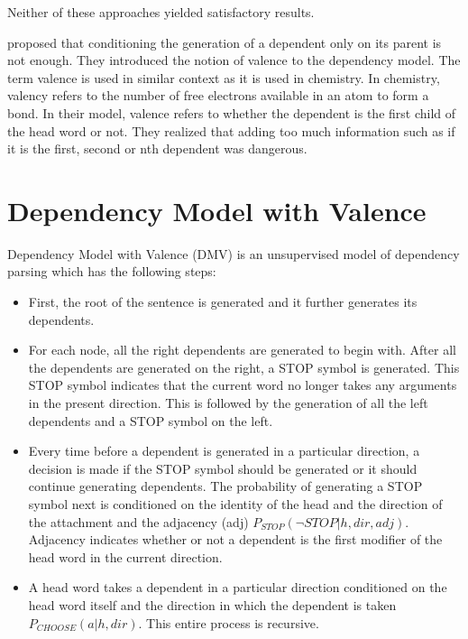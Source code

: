 \documentclass{book}
\begin{document}
Neither of these approaches yielded satisfactory results.

\citep{klein2004} proposed that conditioning the generation of a dependent only on its parent is not enough. They introduced the notion of valence to the dependency model. The term valence is used in similar context as it is used in chemistry. In chemistry, valency refers to the number of free electrons available in an atom to form a bond. In their model, valence refers to whether the dependent is the first child of the head word or not. They realized that adding too much information such as if it is the first, second or nth dependent was dangerous.

\section{Dependency Model with Valence}

Dependency Model with Valence (DMV) is an unsupervised model of dependency parsing which has the following steps:

\begin{itemize}

\item First, the root of the sentence is generated and it further generates its dependents.

\item For each node, all the right dependents are generated to begin with. After all the dependents are generated on the right, a STOP symbol is generated. This STOP symbol indicates that the current word no longer takes any arguments in the present direction. This is followed by the generation of all the left dependents and a STOP symbol on the left. 

\item Every time before a dependent is generated in a particular direction, a decision is made if the STOP symbol should be generated or it should continue generating dependents. The probability of generating a STOP symbol next is conditioned on the identity of the head and the direction of the attachment and the adjacency (adj) $P_{STOP}(\neg STOP | h, dir, adj)$. Adjacency indicates whether or not a dependent is the first modifier of the head word in the current direction.

\item A head word takes a dependent in a particular direction conditioned on the head word itself and the direction in which the dependent is taken $P_{CHOOSE}(a|h, dir)$. This entire process is recursive.

\end{itemize}
\end{document}
